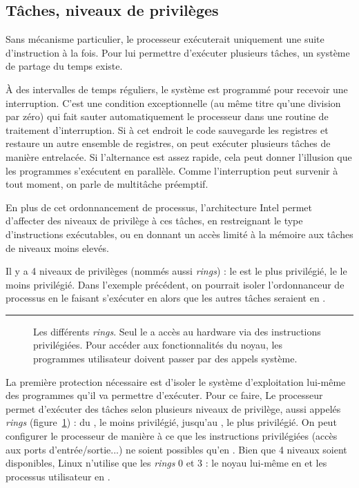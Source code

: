 \subsection{Tâches, niveaux de privilèges}
\label{sec:taches}

Sans mécanisme particulier, le processeur exécuterait uniquement une suite
d'instruction à la fois. Pour lui permettre d'exécuter plusieurs tâches, un
système de partage du temps existe.

À des intervalles de temps réguliers, le système est programmé pour recevoir une
interruption. C'est une condition exceptionnelle (au même titre qu'une division
par zéro) qui fait sauter automatiquement le processeur dans une routine de
traitement d'interruption. Si à cet endroit le code sauvegarde les registres et
restaure un autre ensemble de registres, on peut exécuter plusieurs tâches de
manière entrelacée. Si l'alternance est assez rapide, cela peut donner
l'illusion que les programmes s'exécutent en parallèle. Comme l'interruption
peut survenir à tout moment, on parle de multitâche préemptif.

En plus de cet ordonnancement de processus, l'architecture Intel permet
d'affecter des niveaux de privilège à ces tâches, en restreignant le type
d'instructions exécutables, ou en donnant un accès limité à la mémoire aux
tâches de niveaux moins elevés.

Il y a 4 niveaux de privilèges (nommés aussi \emph{rings}) : le  est le
plus privilégié, le  le moins privilégié. Dans l'exemple précédent, on
pourrait isoler l'ordonnanceur de processus en le faisant s'exécuter en 
alors que les autres tâches seraient en .

\begin{center}\rule{3in}{0.4pt}\end{center}


\begin{figure}

\caption[Les différents \emph{rings}]{
  Les différents \emph{rings}. Seul le  a accès au hardware
  via des instructions privilégiées. Pour accéder aux fonctionnalités du noyau,
  les programmes utilisateur doivent passer par des appels système.}
\label{fig:rings}
\end{figure}

La première protection nécessaire est d'isoler le système d'exploitation
lui-même des programmes qu'il va permettre d'exécuter. Pour ce faire, Le
processeur permet d'exécuter des tâches selon plusieurs niveaux de privilège,
aussi appelés \emph{rings} (figure~\ref{fig:rings}) : du , le
moins privilégié, jusqu'au , le plus privilégié. On peut configurer
le processeur de manière à ce que les instructions privilégiées (accès aux ports
d'entrée/sortie...) ne soient possibles qu'en . Bien que 4 niveaux
soient disponibles, Linux n'utilise que les \emph{rings} 0 et 3 : le noyau
lui-même en  et les processus utilisateur en .

